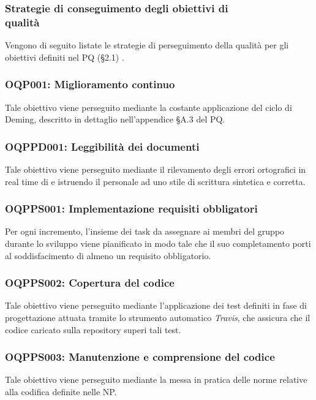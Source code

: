 \documentclass[../NormediProgetto.tex]{subfiles}
\begin{document}
\subsubsection{Strategie di conseguimento degli obiettivi di \\ qualità}

Vengono di seguito listate le strategie di perseguimento della qualità per gli obiettivi definiti nel PQ (§2.1) .

\subsubsection{OQP001: Miglioramento continuo}
Tale obiettivo viene perseguito mediante la costante applicazione del ciclo di Deming, descritto in dettaglio nell'appendice §A.3 del PQ.

\subsubsection{OQPPD001: Leggibilità dei documenti}
Tale obiettivo viene perseguito mediante il rilevamento degli errori ortografici in real time di  e istruendo il personale ad uno stile di scrittura sintetica e corretta.

\subsubsection{OQPPS001: Implementazione requisiti obbligatori}
Per ogni incremento, l'insieme dei task da assegnare ai membri del gruppo durante lo sviluppo viene pianificato in modo tale che il suo completamento porti al soddisfacimento di almeno un requisito obbligatorio.   

\subsubsection{OQPPS002: Copertura del codice}
Tale obiettivo viene perseguito mediante l'applicazione dei test definiti in fase di progettazione attuata tramite lo strumento automatico \textit{Travis}, che assicura che il codice caricato sulla repository superi tali test.

\subsubsection{OQPPS003: Manutenzione e comprensione del codice}
Tale obiettivo viene perseguito mediante la messa in pratica delle norme relative alla codifica definite nelle NP.
\end{document}
